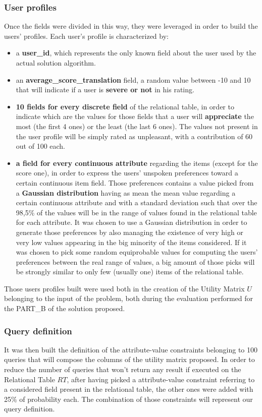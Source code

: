 \subsubsection{User profiles}
Once the fields were divided in this way, they were leveraged in order to build the users' profiles. Each user's profile is characterized by:
\begin{itemize}
    \item a \textbf{user\_id}, which represents the only known field about the user used by the actual solution algorithm.
    \item an \textbf{average\_score\_translation} field, a random value between -10 and 10 that will indicate if a user is \textbf{severe or not} in his rating.
    \item \textbf{10 fields for every discrete field} of the relational table, in order to indicate which are the values for those fields that a user will \textbf{appreciate} the most (the first 4 ones) or the least (the last 6 ones). The values not present in the user profile will be simply rated as unpleasant, with a contribution of 60 out of 100 each.
    \item \textbf{a field for every continuous attribute} regarding the items (except for the score one), in order to express the users' unspoken preferences toward a certain continuous item field. Those preferences contains a value picked from a \textbf{Gaussian distribution} having as mean the mean value regarding a certain continuous attribute and with a standard deviation such that over the 98,5\% of the values will be in the range of values found in the relational table for each attribute. It was chosen to use a Gaussian distribution in order to generate those preferences by also managing the existence of very high or very low values appearing in the big minority of the items considered. If it was chosen to pick some random equiprobable values for computing the users' preferences between the real range of values, a big amount of those picks will be strongly similar to only few (usually one) items of the relational table.
\end{itemize}
Those users profiles built were used both in the creation of the Utility Matrix $U$ belonging to the input of the problem, both during the evaluation performed for the PART\_B of the solution proposed.

\subsubsection{Query definition}
It was then built the definition of the attribute-value constraints belonging to 100 queries that will compose the columns of the utility matrix proposed. In order to reduce the number of queries that won't return any result if executed on the Relational Table $RT$, after having picked a attribute-value constraint referring to a considered field present in the relational table, the other ones were added with 25\% of probability each. The combination of those constraints will represent our query definition.

